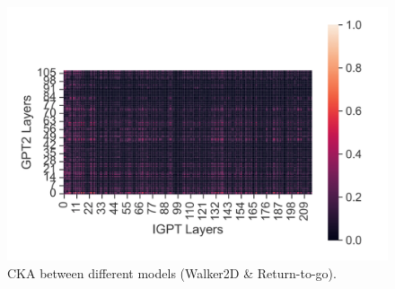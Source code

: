 \documentclass{article}
\begin{document}
\begin{figure}[H]
\begin{minipage}[b]{0.32\linewidth}
        \includegraphics[width=\linewidth]{figs/cka_40_40_gpt2igpt_walker2d_medium_666_reward.png}
    \end{minipage}
    \caption{CKA between different models (Walker2D \& Return-to-go).}
\end{figure}
\end{document}
